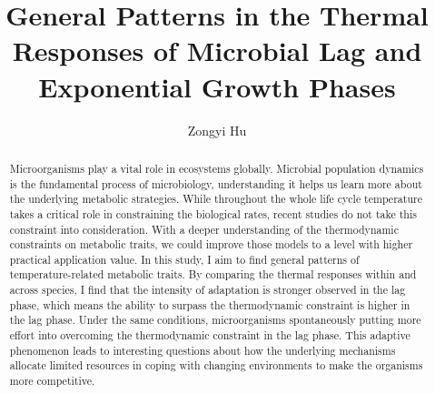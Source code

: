 \documentclass[a4paper]{article}
\title{\vspace{3em}General Patterns in the Thermal \vspace{+1.7em} Responses of Microbial Lag and Exponential Growth Phases}
\author{Zongyi Hu}
\begin{document}

 
\linenumbers

\begin{abstract}

Microorganisms play a vital role in ecosystems globally. Microbial population dynamics is the fundamental process of microbiology, understanding it helps us learn more about the underlying metabolic strategies. While throughout the whole life cycle temperature takes a critical role in constraining the biological rates, recent studies do not take this constraint into consideration. With a deeper understanding of the thermodynamic constraints on metabolic traits, we could improve those models to a level with higher practical application value. In this study, I aim to find general patterns of temperature-related metabolic traits. By comparing the thermal responses within and across species, I find that the intensity of adaptation is stronger observed in the lag phase, which means the ability to surpass the thermodynamic constraint is higher in the lag phase. Under the same conditions, microorganisms spontaneously putting more effort into overcoming the thermodynamic constraint in the lag phase. This adaptive phenomenon leads to interesting questions about how the underlying mechanisms allocate limited resources in coping with changing environments to make the organisms more competitive.\\

\end{abstract}



\newpage
\tableofcontents

\newpage
\thispagestyle{empty}
\listoffigures
\listoftables
\clearpage
{}


\newpage
\end{document}
